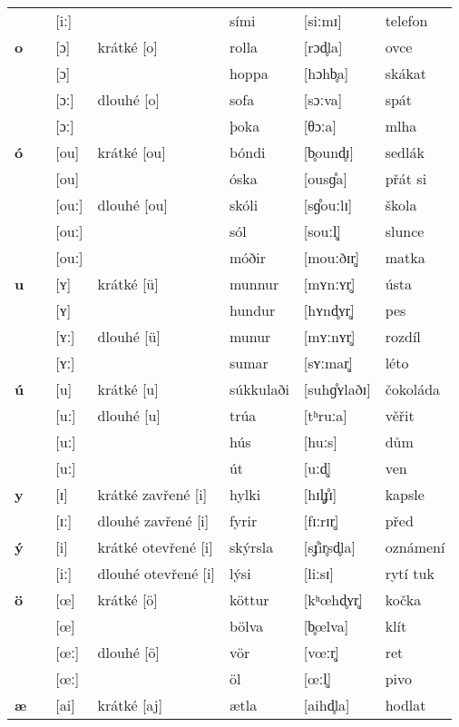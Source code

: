 \begin{longtable}{>{\bfseries}lX>{\IPAfont}lXl>{\IPAfont}ll}
 &  & {[iː]} &  & sími & {[siːmɪ]} & telefon \\ 
o &  & {[ɔ]} & krátké [o] & rolla & {[rɔd̥la]} & ovce \\ 
 &  & {[ɔ]} &  & hoppa & {[hɔhb̥a]} & skákat \\ 
 &  & {[ɔː]} & dlouhé [o] & sofa & {[sɔːva]} & spát \\ 
 &  & {[ɔː]} &  & þoka & {[θɔːa]} & mlha \\ 
ó &  & {[ou]} & krátké [ou] & bóndi & {[b̥ound̥ɪ]} & sedlák \\ 
 &  & {[ou]} &  & óska & {[ousɡ̊a]} & přát si \\ 
 &  & {[ouː]} & dlouhé [ou] & skóli & {[sɡ̊ouːlɪ]} & škola \\ 
 &  & {[ouː]} &  & sól & {[souːl̥]} & slunce \\ 
 &  & {[ouː]} &  & móðir & {[mouːðɪr̥]} & matka \\ 
u &  & {[ʏ]} & krátké [ü] & munnur & {[mʏnːʏr̥]} & ústa \\ 
 &  & {[ʏ]} &  & hundur & {[hʏnd̥ʏr̥]} & pes \\ 
 &  & {[ʏː]} & dlouhé [ü] & munur & {[mʏːnʏr̥]} & rozdíl \\ 
 &  & {[ʏː]} &  & sumar & {[sʏːmar̥]} & léto \\ 
ú &  & {[u]} & krátké [u] & súkkulaði & {[suhɡ̊ʏlaðɪ]} & čokoláda \\ 
 &  & {[uː]} & dlouhé [u] & trúa & {[tʰruːa]} & věřit \\ 
 &  & {[uː]} &  & hús & {[huːs]} & dům \\ 
 &  & {[uː]} &  & út & {[uːd̥]} & ven \\ 
y &  & {[ɪ]} & krátké zavřené [i] & hylki & {[hɪl̥\r ɟɪ]} & kapsle \\ 
 &  & {[ɪː]} & dlouhé zavřené [i] & fyrir & {[fɪːrɪr̥]} & před \\ 
ý &  & {[i]} & krátké otevřené [i] & skýrsla & {[s\r ɟir̥sd̥la]} & oznámení \\ 
 &  & {[iː]} & dlouhé otevřené [i] & lýsi & {[liːsɪ]} & rytí tuk \\ 
ö &  & {[\oe]} & krátké [ö] & köttur & {[kʰ\oe hd̥ʏr̥]} & kočka \\ 
 &  & {[\oe]} &  & bölva & {[b̥\oe lva]} & klít \\ 
 &  & {[\oe ː]} & dlouhé [ö] & vör & {[v\oe ːr̥]} & ret \\ 
 &  & {[\oe ː]} &  & öl & {[\oe ːl̥]} & pivo \\ 
æ &  & {[ai]} & krátké [aj] & ætla & {[aihd̥la]} & hodlat \\ 

\end{longtable}
